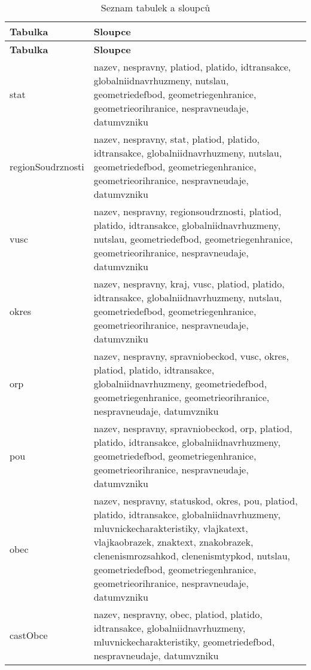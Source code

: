 \begin{center}
  \begin{longtable}{|>{\raggedright\arraybackslash}p{4cm}|>{\raggedright\arraybackslash}p{9cm}|}
    \caption{Seznam tabulek a sloupců} \\

    \hline
    \textbf{Tabulka} & \textbf{Sloupce} \\
    \hline
    \endfirsthead
    
    \hline
    \textbf{Tabulka} & \textbf{Sloupce} \\
    \hline
    \endhead
  
    stat & nazev, nespravny, platiod, platido, idtransakce, globalniidnavrhuzmeny, nutslau, geometriedefbod, geometriegenhranice, geometrieorihranice, nespravneudaje, datumvzniku \\
    \hline
    regionSoudrznosti & nazev, nespravny, stat, platiod, platido, idtransakce, globalniidnavrhuzmeny, nutslau, geometriedefbod, geometriegenhranice, geometrieorihranice, nespravneudaje, datumvzniku \\
    \hline
    vusc & nazev, nespravny, regionsoudrznosti, platiod, platido, idtransakce, globalniidnavrhuzmeny, nutslau, geometriedefbod, geometriegenhranice, geometrieorihranice, nespravneudaje, datumvzniku \\
    \hline
    okres & nazev, nespravny, kraj, vusc, platiod, platido, idtransakce, globalniidnavrhuzmeny, nutslau, geometriedefbod, geometriegenhranice, geometrieorihranice, nespravneudaje, datumvzniku \\
    \hline
    orp & nazev, nespravny, spravniobeckod, vusc, okres, platiod, platido, idtransakce, globalniidnavrhuzmeny, geometriedefbod, geometriegenhranice, geometrieorihranice, nespravneudaje, datumvzniku \\
    \hline
    pou & nazev, nespravny, spravniobeckod, orp, platiod, platido, idtransakce, globalniidnavrhuzmeny, geometriedefbod, geometriegenhranice, geometrieorihranice, nespravneudaje, datumvzniku \\
    \hline
    obec & nazev, nespravny, statuskod, okres, pou, platiod, platido, idtransakce, globalniidnavrhuzmeny, mluvnickecharakteristiky, vlajkatext, vlajkaobrazek, znaktext, znakobrazek, clenenismrozsahkod, clenenismtypkod, nutslau, geometriedefbod, geometriegenhranice, geometrieorihranice, nespravneudaje, datumvzniku \\
    \hline
    castObce & nazev, nespravny, obec, platiod, platido, idtransakce, globalniidnavrhuzmeny, mluvnickecharakteristiky, geometriedefbod, nespravneudaje, datumvzniku \\

\end{longtable}
\end{center}
